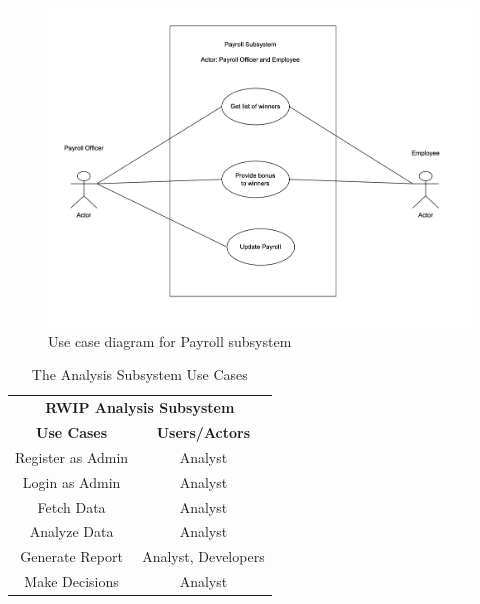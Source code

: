 \begin{figure}[h!t]
    \centering
    \includegraphics[width=\textwidth]{images/ucPayroll.png}
    \caption{Use case diagram for Payroll subsystem}
    \label{fig:ucPayroll}
\end{figure}

\begin{table}[h!t]
\caption{The Analysis Subsystem Use Cases}
{%
\newcommand{\mc}[2]{\multicolumn{#1}{#2}}
\begin{center}
\begin{tabular}{|c|c|}
\hline
\multicolumn{2}{|c|}{\textbf{RWIP Analysis Subsystem}} \\ \cline{1-2}
\textbf{Use Cases} & \textbf{Users/Actors} \\
\hline
\rule{0pt}{24pt}  Register as Admin & Analyst \\
\hline
\rule{0pt}{24pt}  Login as Admin & Analyst \\
\hline
\rule{0pt}{24pt}  Fetch Data & Analyst \\
\hline
\rule{0pt}{24pt}  Analyze Data & Analyst \\
\hline
\rule{0pt}{24pt}  Generate Report & Analyst, Developers \\
\hline
\rule{0pt}{24pt}  Make Decisions & Analyst \\
\hline
\end{tabular}
\end{center}
}%
\label{tab:analysis}
\end{table}

